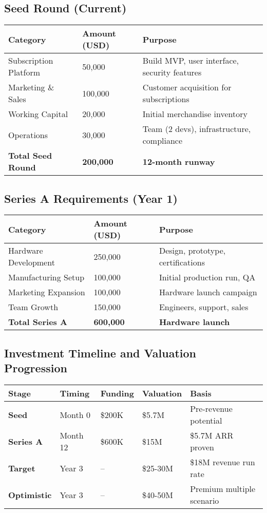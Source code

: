 \documentclass[11pt]{article}
\begin{document}
\subsection{Seed Round (Current)}
\begin{table}[H]
\centering
\begin{tabularx}{\linewidth}{l Y Y}
\toprule
Category & Amount (USD) & Purpose \\\midrule
Subscription Platform & 50,000 & Build MVP, user interface, security features \\
Marketing \& Sales & 100,000 & Customer acquisition for subscriptions \\
Working Capital & 20,000 & Initial merchandise inventory \\
Operations & 30,000 & Team (2 devs), infrastructure, compliance \\
\textbf{Total Seed Round} & \textbf{200,000} & \textbf{12-month runway} \\
\bottomrule
\end{tabularx}
\end{table}

\subsection{Series A Requirements (Year 1)}
\begin{table}[H]
\centering
\begin{tabularx}{\linewidth}{l Y Y}
\toprule
Category & Amount (USD) & Purpose \\\midrule
Hardware Development\cite{ycombinator2023} & 250,000 & Design, prototype, certifications \\
Manufacturing Setup & 100,000 & Initial production run, QA \\
Marketing Expansion & 100,000 & Hardware launch campaign \\
Team Growth & 150,000 & Engineers, support, sales \\
\textbf{Total Series A} & \textbf{600,000} & \textbf{Hardware launch} \\
\bottomrule
\end{tabularx}
\end{table}

\subsection{Investment Timeline and Valuation Progression}
\begin{table}[H]
\centering
\begin{tabularx}{\linewidth}{l Y Y Y Y}
\toprule
Stage & Timing & Funding & Valuation & Basis \\\midrule
\textbf{Seed} & Month 0 & \$200K & \$5.7M & Pre-revenue potential \\
\textbf{Series A} & Month 12 & \$600K & \$15M & \$5.7M ARR proven \\
\textbf{Target} & Year 3 & -- & \$25-30M & \$18M revenue run rate \\
\textbf{Optimistic} & Year 3 & -- & \$40-50M & Premium multiple scenario \\
\bottomrule
\end{tabularx}
\end{table}
\end{document}
